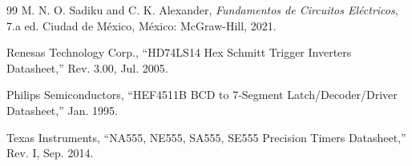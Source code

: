 \documentclass[12pt, journal, onecolumn]{IEEEtran}
\begin{document}
\begin{thebibliography}{99}
M. N. O. Sadiku and C. K. Alexander, \textit{Fundamentos de Circuitos Eléctricos}, 7.a ed. Ciudad de México, México: McGraw-Hill, 2021.

Renesas Technology Corp., ``HD74LS14 Hex Schmitt Trigger Inverters Datasheet,'' Rev. 3.00, Jul. 2005.

Philips Semiconductors, ``HEF4511B BCD to 7-Segment Latch/Decoder/Driver Datasheet,'' Jan. 1995.

Texas Instruments, ``NA555, NE555, SA555, SE555 Precision Timers Datasheet,'' Rev. I, Sep. 2014.

\end{thebibliography}
\end{document}
